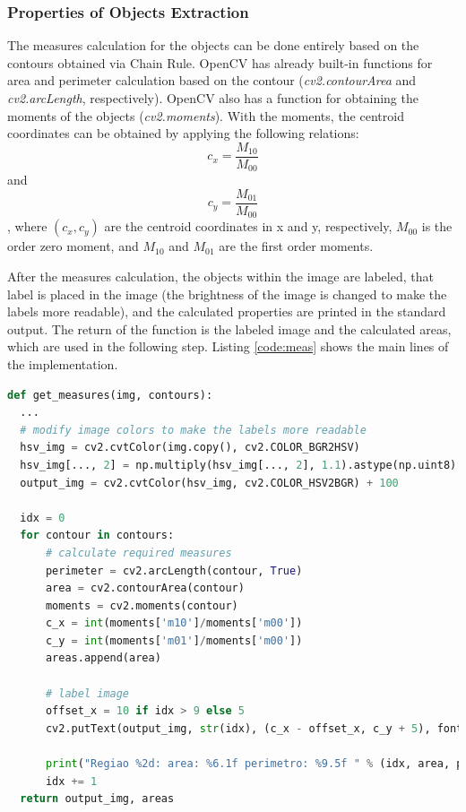 \documentclass[]{IEEEtran}
\begin{document}
\subsubsection{Properties of Objects Extraction}
The measures calculation for the objects can be done entirely based on the contours obtained via Chain Rule. OpenCV has already built-in functions for area and perimeter calculation based on the contour (\textit{cv2.contourArea} and \textit{cv2.arcLength}, respectively). OpenCV also has a function for obtaining the moments of the objects (\textit{cv2.moments}). With the moments, the centroid coordinates can be obtained by applying the following relations:
\begin{equation}
  c_{x} = \dfrac{M_{10}}{M_{00}}
\end{equation}
 and 
\begin{equation}
  c_{y} = \dfrac{M_{01}}{M_{00}}
\end{equation},
where $(c_{x}, c_{y})$ are the centroid coordinates in x and y, respectively, $M_{00}$ is the order zero moment, and $M_{10}$ and $M_{01}$ are the first order moments.
\par After the measures calculation, the objects within the image are labeled, that label is placed in the image (the brightness of the image is changed to make the labels more readable), and the calculated properties are printed in the standard output. The return of the function is the labeled image and the calculated areas, which are used in the following step.
Listing \ref{code:meas} shows the main lines of the implementation.

\begin{lstlisting}[language=Python, caption={Properties Extraction Implementation}, label={code:meas}]
def get_measures(img, contours):
  ...
  # modify image colors to make the labels more readable
  hsv_img = cv2.cvtColor(img.copy(), cv2.COLOR_BGR2HSV)
  hsv_img[..., 2] = np.multiply(hsv_img[..., 2], 1.1).astype(np.uint8)
  output_img = cv2.cvtColor(hsv_img, cv2.COLOR_HSV2BGR) + 100

  idx = 0
  for contour in contours:
      # calculate required measures
      perimeter = cv2.arcLength(contour, True)
      area = cv2.contourArea(contour)
      moments = cv2.moments(contour)
      c_x = int(moments['m10']/moments['m00'])
      c_y = int(moments['m01']/moments['m00'])
      areas.append(area)

      # label image
      offset_x = 10 if idx > 9 else 5
      cv2.putText(output_img, str(idx), (c_x - offset_x, c_y + 5), font, 0.5, (0, 0, 0), 2)

      print("Regiao %2d: area: %6.1f perimetro: %9.5f " % (idx, area, perimeter))
      idx += 1
  return output_img, areas
\end{lstlisting}
\end{document}

